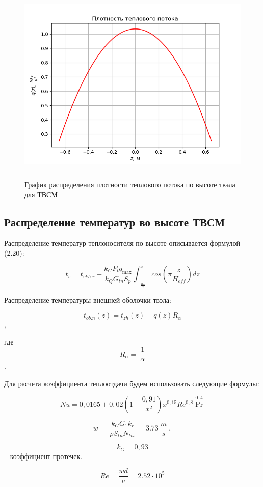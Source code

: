 \begin{figure}[!h]
\center
\includegraphics[width=5.11811in,height=3.80659in]{media/image9.png}
\caption{График распределения плотности теплового потока по высоте
твэла для ТВСМ}
\end{figure}

\subsection{Распределение температур во высоте ТВСМ}

Распределение температур теплоносителя по высоте описывается формулой
(2.20):

\[t_{v} = t_{vkh.r} + \frac{k_{G}P_{t}q_{\max}}{k_{Q}G_{tn}S_{p}}\int_{-_{\frac{H_{az}}{2}}}^{z}{cos\left( \pi\frac{z}{H_{eff}} \right)dz}\]

Распределение температуры внешней оболочки твэла:

\[t_{ob.n}\left( z \right) = t_{zh}\left( z \right) + q\left( z \right)R_{\alpha}\],

где \[R_{\alpha} = \ \frac{1}{\alpha}\] .

Для расчета коэффициента теплоотдачи будем использовать следующие
формулы:

\[Nu =  0,0165 + 0,02\left( 1 - \frac{0,91}{x^{2}} \right)x^{0,15} Re^{0,8}\Pr^{0,4}\]

\[w = \ \frac{k_{G}G_{1}k_{r}}{\rho S_{tn}N_{tvs}} = 3.73\ \frac{m}{s}\ ,\]

\[k_{G} = 0,93\] -- коэффициент протечек.

\[Re = \frac{wd}{\nu} = 2.52 \cdot 10^{5}\]

